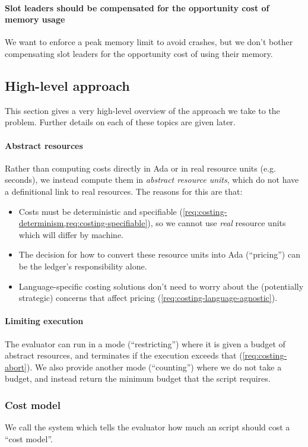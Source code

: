 \paragraph{Slot leaders should be compensated for the opportunity cost of memory usage}
We want to enforce a peak memory limit to avoid crashes, but we don't bother compensating slot leaders for the opportunity cost of using their memory.

\subsection{High-level approach}
This section gives a very high-level overview of the approach we take to the problem.
Further details on each of these topics are given later.

\paragraph{Abstract resources}
Rather than computing costs directly in Ada or in real resource units (e.g. seconds), we instead compute them in \emph{abstract resource units}, which do not have a definitional link to real resources.
The reasons for this are that:
\begin{itemize}
\item Costs must be deterministic and specifiable (\cref{req:costing-determinism,req:costing-specifiable}), so we cannot use \emph{real} resource units which will differ by machine.
\item The decision for how to convert these resource units into Ada (``pricing'') can be the ledger's responsibility alone.
\item Language-specific costing solutions don't need to worry about the (potentially strategic) concerns that affect pricing (\cref{req:costing-language-agnostic}).
\end{itemize}

\paragraph{Limiting execution}
The evaluator can run in a mode (``restricting'') where it is given a budget of abstract resources, and terminates if the execution exceeds that (\cref{req:costing-abort}).
We also provide another mode (``counting'') where we do not take a budget, and instead return the minimum budget that the script requires.

\subsubsection{Cost model}
We call the system which tells the evaluator how much an script should cost a ``cost model''.

